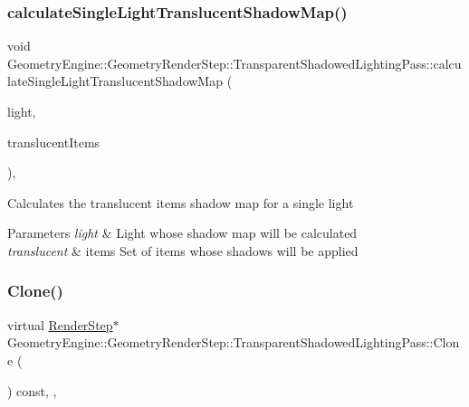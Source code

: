 \subsubsection{\texorpdfstring{calculateSingleLightTranslucentShadowMap()}{calculateSingleLightTranslucentShadowMap()}}
{\footnotesize\ttfamily void Geometry\+Engine\+::\+Geometry\+Render\+Step\+::\+Transparent\+Shadowed\+Lighting\+Pass\+::calculate\+Single\+Light\+Translucent\+Shadow\+Map (\begin{DoxyParamCaption}\item[{\mbox{\hyperlink{class_geometry_engine_1_1_geometry_world_item_1_1_geometry_light_1_1_light}{Geometry\+World\+Item\+::\+Geometry\+Light\+::\+Light}} $\ast$}]{light,  }\item[{std\+::unordered\+\_\+set$<$ \mbox{\hyperlink{class_geometry_engine_1_1_geometry_world_item_1_1_geometry_item_1_1_geometry_item}{Geometry\+World\+Item\+::\+Geometry\+Item\+::\+Geometry\+Item}} $\ast$ $>$ $\ast$}]{translucent\+Items }\end{DoxyParamCaption})\hspace{0.3cm}{\ttfamily [protected]}, {\ttfamily [virtual]}}

Calculates the translucent items shadow map for a single light 
\begin{DoxyParams}{Parameters}
{\em light} & Light whose shadow map will be calculated \\
\hline
{\em translucent} & items Set of items whose shadows will be applied \\
\hline
\end{DoxyParams}
\mbox{\label{class_geometry_engine_1_1_geometry_render_step_1_1_transparent_shadowed_lighting_pass_a56d2ef131669ae3964a04cb54e6c3b0f}} 
\subsubsection{\texorpdfstring{Clone()}{Clone()}}
{\footnotesize\ttfamily virtual \mbox{\hyperlink{class_geometry_engine_1_1_geometry_render_step_1_1_render_step}{Render\+Step}}$\ast$ Geometry\+Engine\+::\+Geometry\+Render\+Step\+::\+Transparent\+Shadowed\+Lighting\+Pass\+::\+Clone (\begin{DoxyParamCaption}{ }\end{DoxyParamCaption}) const\hspace{0.3cm}{\ttfamily [inline]}, {\ttfamily [override]}, {\ttfamily [virtual]}}

